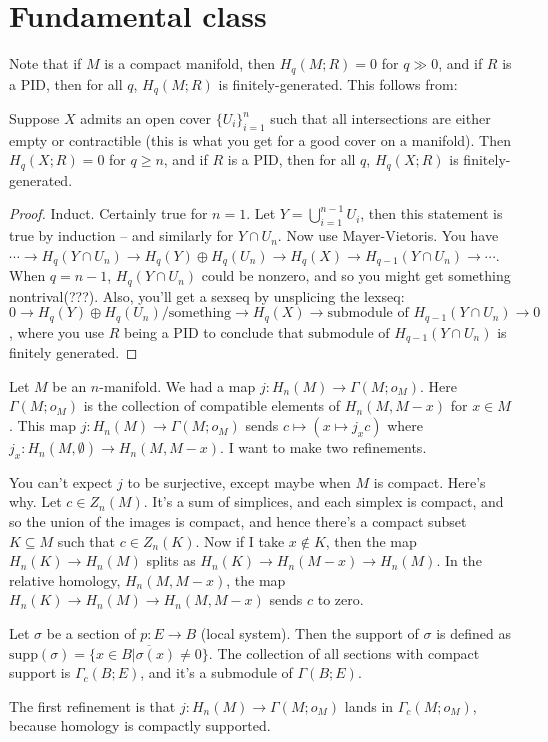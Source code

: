 \section{Fundamental class}
Note that if $M$ is a compact manifold, then $H_q(M;R)=0$ for $q\gg 0$, and if $R$ is a PID, then for all $q$, $H_q(M;R)$ is finitely-generated. This follows from:
\begin{claim}
Suppose $X$ admits an open cover $\{U_i\}_{i=1}^n$ such that all intersections are either empty or contractible (this is what you get for a good cover on a manifold). Then $H_q(X;R)=0$ for $q\geq n$, and if $R$ is a PID, then for all $q$, $H_q(X;R)$ is finitely-generated.
\end{claim}
\begin{proof}
Induct. Certainly true for $n=1$. Let $Y=\bigcup^{n-1}_{i=1}U_i$, then this statement is true by induction -- and similarly for $Y\cap U_n$. Now use Mayer-Vietoris. You have $\cdots\to H_q(Y\cap U_n)\to H_q(Y)\oplus H_q(U_n)\to H_q(X)\to H_{q-1}(Y\cap U_n)\to\cdots$. When $q=n-1$, $H_q(Y\cap U_n)$ could be nonzero, and so you might get something nontrival(???). Also, you'll get a sexseq by unsplicing the lexseq: $0\to H_q(Y)\oplus H_q(U_n)/\text{something}\to H_q(X)\to \text{submodule of }H_{q-1}(Y\cap U_n)\to 0$, where you use $R$ being a PID to conclude that $\text{submodule of }H_{q-1}(Y\cap U_n)$ is finitely generated.
\end{proof}
Let $M$ be an $n$-manifold. We had a map $j:H_n(M)\to \Gamma(M;o_M)$. Here $\Gamma(M;o_M)$ is the collection of compatible elements of $H_n(M,M-x)$ for $x\in M$. This map $j:H_n(M)\to \Gamma(M;o_M)$ sends $c\mapsto(x\mapsto j_x c)$ where $j_x:H_n(M,\emptyset)\to H_n(M,M-x)$. I want to make two refinements.

You can't expect $j$ to be surjective, except maybe when $M$ is compact. Here's why. Let $c\in Z_n(M)$. It's a sum of simplices, and each simplex is compact, and so the union of the images is compact, and hence there's a compact subset $K\subseteq M$ such that $c\in Z_n(K)$. Now if I take $x\not\in K$, then the map $H_n(K)\to H_n(M)$ splits as $H_n(K)\to H_n(M-x)\to H_n(M)$. In the relative homology, $H_n(M,M-x)$, the map $H_n(K)\to H_n(M)\to H_n(M,M-x)$ sends $c$ to zero.
\begin{definition}
Let $\sigma$ be a section of $p:E\to B$ (local system). Then the support of $\sigma$ is defined as $\mathrm{supp}(\sigma)=\overline{\{x\in B|\sigma(x)\neq 0\}}$. The collection of all sections with compact support is $\Gamma_c(B;E)$, and it's a submodule of $\Gamma(B;E)$.
\end{definition}
The first refinement is that $j:H_n(M)\to \Gamma(M;o_M)$ lands in $\Gamma_c(M;o_M)$, because homology is compactly supported.

